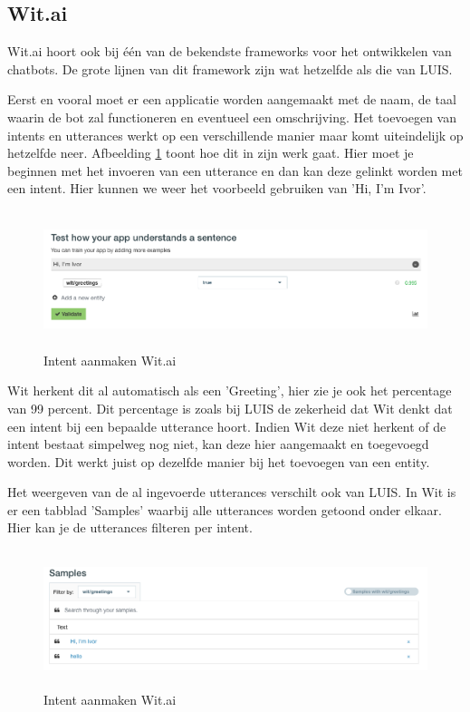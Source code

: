 \subsection{Wit.ai}
\label{Wit}

Wit.ai hoort ook bij één van de bekendste frameworks voor het ontwikkelen van chatbots. De grote lijnen van dit framework zijn wat hetzelfde als die van LUIS.

Eerst en vooral moet er een applicatie worden aangemaakt met de naam, de taal waarin de bot zal functioneren en eventueel een omschrijving. Het toevoegen van intents en utterances werkt op een verschillende manier maar komt uiteindelijk op hetzelfde neer. Afbeelding \ref{fig:intentsWit} toont hoe dit in zijn werk gaat. Hier moet je beginnen met het invoeren van een utterance en dan kan deze gelinkt worden met een intent. Hier kunnen we weer het voorbeeld gebruiken van 'Hi, I'm Ivor'.

\begin{figure}[h!]
	\centering
	\includegraphics[height=4cm]{img/wit_intents.png}
	\caption{Intent aanmaken Wit.ai}
	\label{fig:intentsWit}
\end{figure}

Wit herkent dit al automatisch als een 'Greeting', hier zie je ook het percentage van 99 percent. Dit percentage is zoals bij LUIS de zekerheid dat Wit denkt dat een intent bij een bepaalde utterance hoort. Indien Wit deze niet herkent of de intent bestaat simpelweg nog niet, kan deze hier aangemaakt en toegevoegd worden. Dit werkt juist op dezelfde manier bij het toevoegen van een entity.

Het weergeven van de al ingevoerde utterances verschilt ook van LUIS. In Wit is er een tabblad 'Samples' waarbij alle utterances worden getoond onder elkaar. Hier kan je de utterances filteren per intent.

\begin{figure}[h!]
	\centering
	\includegraphics[height=4cm]{img/samples.png}
	\caption{Intent aanmaken Wit.ai}
	\label{fig:samples}
\end{figure}

